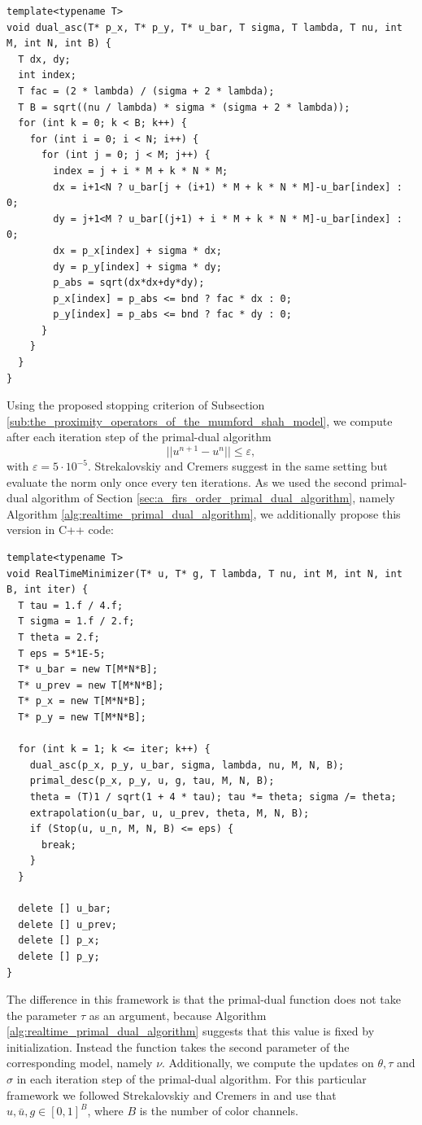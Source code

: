 \documentclass[abstracton]{scrreprt}
\begin{document}
        \begin{lstlisting}
template<typename T>
void dual_asc(T* p_x, T* p_y, T* u_bar, T sigma, T lambda, T nu, int M, int N, int B) {
  T dx, dy;
  int index;
  T fac = (2 * lambda) / (sigma + 2 * lambda);
  T B = sqrt((nu / lambda) * sigma * (sigma + 2 * lambda));
  for (int k = 0; k < B; k++) {
    for (int i = 0; i < N; i++) {
      for (int j = 0; j < M; j++) {
        index = j + i * M + k * N * M;
        dx = i+1<N ? u_bar[j + (i+1) * M + k * N * M]-u_bar[index] : 0;
        dy = j+1<M ? u_bar[(j+1) + i * M + k * N * M]-u_bar[index] : 0;
        dx = p_x[index] + sigma * dx;
        dy = p_y[index] + sigma * dy;
        p_abs = sqrt(dx*dx+dy*dy);
        p_x[index] = p_abs <= bnd ? fac * dx : 0;
        p_y[index] = p_abs <= bnd ? fac * dy : 0;
      }
    }
  }
}
        \end{lstlisting}
        Using the proposed stopping criterion of Subsection \ref{sub:the_proximity_operators_of_the_mumford_shah_model}, we compute after each iteration step of the primal-dual algorithm
            $$
                ||u^{n+1} - u^{n}|| \le \varepsilon,
            $$
        with $\varepsilon = 5 \cdot 10^{-5}$. Strekalovskiy and Cremers suggest in \cite{Strekalovskiy-Cremers-eccv14} the same setting but evaluate the norm only once every ten iterations. As we used the second primal-dual algorithm of Section \ref{sec:a_firs_order_primal_dual_algorithm}, namely Algorithm \ref{alg:realtime_primal_dual_algorithm}, we additionally propose this version in C++ code:
        \begin{lstlisting}
template<typename T>
void RealTimeMinimizer(T* u, T* g, T lambda, T nu, int M, int N, int B, int iter) {
  T tau = 1.f / 4.f;
  T sigma = 1.f / 2.f;
  T theta = 2.f;
  T eps = 5*1E-5;
  T* u_bar = new T[M*N*B];
  T* u_prev = new T[M*N*B];
  T* p_x = new T[M*N*B];
  T* p_y = new T[M*N*B];

  for (int k = 1; k <= iter; k++) {
    dual_asc(p_x, p_y, u_bar, sigma, lambda, nu, M, N, B);
    primal_desc(p_x, p_y, u, g, tau, M, N, B);
    theta = (T)1 / sqrt(1 + 4 * tau); tau *= theta; sigma /= theta;
    extrapolation(u_bar, u, u_prev, theta, M, N, B);
    if (Stop(u, u_n, M, N, B) <= eps) {
      break;
    }
  }

  delete [] u_bar;
  delete [] u_prev;
  delete [] p_x;
  delete [] p_y;
}
        \end{lstlisting}
        The difference in this framework is that the primal-dual function does not take the parameter $\tau$ as an argument, because Algorithm \ref{alg:realtime_primal_dual_algorithm} suggests that this value is fixed by initialization. Instead the function takes the second parameter of the corresponding model, namely $\nu$. Additionally, we compute the updates on $\theta, \tau$ and $\sigma$ in each iteration step of the primal-dual algorithm. For this particular framework we followed Strekalovskiy and Cremers in \cite{Strekalovskiy-Cremers-eccv14} and use that $u, \bar{u}, g \in [0,1]^{B}$, where $B$ is the number of color channels.
\end{document}
